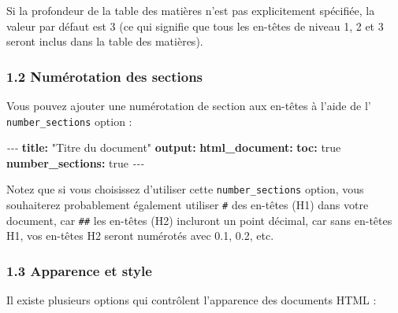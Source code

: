 \documentclass[
]{article}
\newenvironment{Shaded}{\begin{snugshade}}{\end{snugshade}}
\newcommand{\AttributeTok}[1]{\textcolor[rgb]{0.13,0.29,0.53}{#1}}
\newcommand{\CharTok}[1]{\textcolor[rgb]{0.31,0.60,0.02}{#1}}
\newcommand{\FunctionTok}[1]{\textcolor[rgb]{0.13,0.29,0.53}{\textbf{#1}}}
\newcommand{\KeywordTok}[1]{\textcolor[rgb]{0.13,0.29,0.53}{\textbf{#1}}}
\newcommand{\PreprocessorTok}[1]{\textcolor[rgb]{0.56,0.35,0.01}{\textit{#1}}}
\newcommand{\StringTok}[1]{\textcolor[rgb]{0.31,0.60,0.02}{#1}}
\begin{document}
Si la profondeur de la table des matières n'est pas explicitement
spécifiée, la valeur par défaut est 3 (ce qui signifie que tous les
en-têtes de niveau 1, 2 et 3 seront inclus dans la table des matières).

\hypertarget{numuxe9rotation-des-sections}{%
\subsubsection{1.2 Numérotation des
sections}\label{numuxe9rotation-des-sections}}

Vous pouvez ajouter une numérotation de section aux en-têtes à l'aide de
l' \texttt{number\_sections} option :

\begin{Shaded}
\begin{Highlighting}[]
\PreprocessorTok{{-}{-}{-}}
\FunctionTok{title}\KeywordTok{:}\AttributeTok{ }\StringTok{"Titre du document"}
\FunctionTok{output}\KeywordTok{:}
\AttributeTok{  }\FunctionTok{html\_document}\KeywordTok{:}
\AttributeTok{    }\FunctionTok{toc}\KeywordTok{:}\AttributeTok{ }\CharTok{true}
\AttributeTok{    }\FunctionTok{number\_sections}\KeywordTok{:}\AttributeTok{ }\CharTok{true}
\PreprocessorTok{{-}{-}{-}}
\end{Highlighting}
\end{Shaded}

Notez que si vous choisissez d'utiliser cette \texttt{number\_sections}
option, vous souhaiterez probablement également utiliser \texttt{\#} des
en-têtes (H1) dans votre document, car \texttt{\#\#} les en-têtes (H2)
incluront un point décimal, car sans en-têtes H1, vos en-têtes H2 seront
numérotés avec 0.1, 0.2, etc.

\hypertarget{apparence-et-style}{%
\subsubsection{1.3 Apparence et style}\label{apparence-et-style}}

Il existe plusieurs options qui contrôlent l'apparence des documents
HTML :
\end{document}
